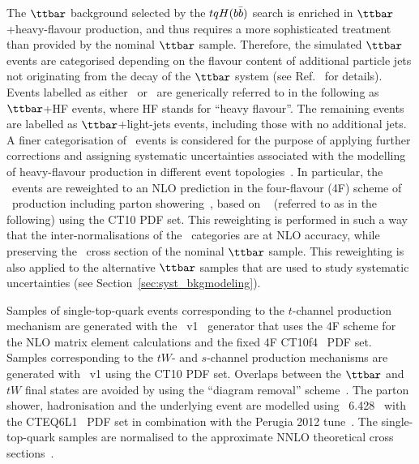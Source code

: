 The $\ttbar$ background selected by the $tqH(b\bar{b})$ search is enriched in $\ttbar$+heavy-flavour production, and thus requires a more sophisticated 
treatment than provided by the nominal $\ttbar$ sample. 
Therefore, the simulated $\ttbar$ events are categorised depending 
on the flavour content of additional particle jets not originating from the decay of the $\ttbar$ system (see Ref.~\cite{Aaboud:2017rss} for details).
Events labelled as either \ttbin\ or \ttcin\ are generically referred to in the following as $\ttbar$+HF events, where HF stands for ``heavy flavour''.
The remaining events are labelled as $\ttbar$+light-jets events, including those with no additional jets. 
A finer categorisation of \ttbin\ events is considered for the purpose of applying further corrections and
assigning systematic uncertainties associated with the modelling of heavy-flavour production in different event topologies~\cite{Aaboud:2017rss}.
In particular, the \ttbin\ events are reweighted to an NLO prediction in the four-flavour (4F) scheme 
of \ttbin\ production including parton showering~\cite{Cascioli:2013era}, based on {\ShOLlong}~\cite{Gleisberg:2008ta, Cascioli:2011va} (referred to as {\ShOL} 
in the following) using the CT10 PDF set.  This reweighting is performed in such a way that the inter-normalisations of the \ttbin\ categories are at NLO accuracy, 
while preserving the \ttbin\ cross section of the nominal $\ttbar$ sample. 
This reweighting is also applied to the alternative $\ttbar$ samples that are used to study systematic uncertainties (see Section~\ref{sec:syst_bkgmodeling}).

Samples of single-top-quark events corresponding to the $t$-channel production mechanism are generated with the 
{\powheg}~v1~\cite{Frederix:2012dh} generator that uses the 4F scheme  for the NLO matrix element calculations
and the fixed 4F \textsc{CT10}f\textsc{4}~\cite{Lai:2010vv} PDF set.
Samples corresponding to the $tW$- and $s$-channel production mechanisms are generated 
with {\powheg}~v1 using the CT10 PDF set. Overlaps between the $\ttbar$ and $tW$ final states are avoided by using 
the ``diagram removal'' scheme~\cite{Frixione:2005vw}.
The parton shower, hadronisation and the underlying event are modelled using {\pythia}~6.428~\cite{Sjostrand:2006za} 
with the CTEQ6L1~\cite{Pumplin:2002vw,Nadolsky:2008zw} PDF set 
in combination with the Perugia 2012 tune~\cite{Skands:2010ak}.
The single-top-quark samples are normalised to the approximate NNLO theoretical cross 
sections~\cite{Kidonakis:2011wy,Kidonakis:2010ux,Kidonakis:2010tc}. 

